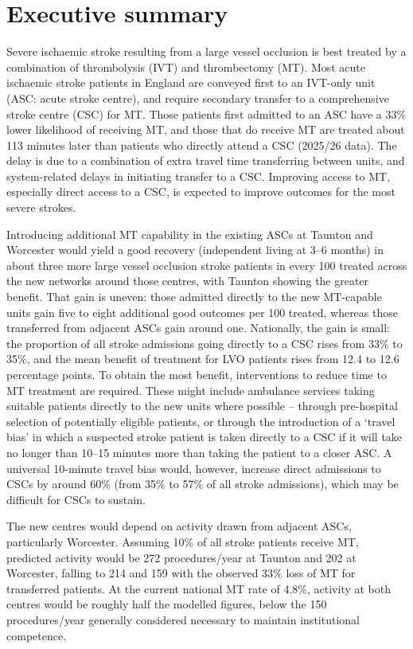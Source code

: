 \section*{Executive summary}

Severe ischaemic stroke resulting from a large vessel occlusion is best treated by a combination of thrombolysis (IVT) and thrombectomy (MT). Most acute ischaemic stroke patients in England are conveyed first to an IVT-only unit (ASC: acute stroke centre), and require secondary transfer to a comprehensive stroke centre (CSC) for MT. Those patients first admitted to an ASC have a 33\% lower likelihood of receiving MT, and those that do receive MT are treated about 113 minutes later than patients who directly attend a CSC (2025/26 data). The delay is due to a combination of extra travel time transferring between units, and system-related delays in initiating transfer to a CSC. Improving access to MT, especially direct access to a CSC, is expected to improve outcomes for the most severe strokes.

Introducing additional MT capability in the existing ASCs at Taunton and Worcester would yield a good recovery (independent living at 3–6 months) in about three more large vessel occlusion stroke patients in every 100 treated across the new networks around those centres, with Taunton showing the greater benefit. That gain is uneven: those admitted directly to the new MT-capable units gain five to eight additional good outcomes per 100 treated, whereas those transferred from adjacent ASCs gain around one. Nationally, the gain is small: the proportion of all stroke admissions going directly to a CSC rises from 33\% to 35\%, and the mean benefit of treatment for LVO patients rises from 12.4 to 12.6 percentage points. To obtain the most benefit, interventions to reduce time to MT treatment are required. These might include ambulance services taking suitable patients directly to the new units where possible -- through pre-hospital selection of potentially eligible patients, or through the introduction of a `travel bias' in which a suspected stroke patient is taken directly to a CSC if it will take no longer than 10--15 minutes more than taking the patient to a closer ASC. A universal 10-minute travel bias would, however, increase direct admissions to CSCs by around 60\% (from 35\% to 57\% of all stroke admissions), which may be difficult for CSCs to sustain.

The new centres would depend on activity drawn from adjacent ASCs, particularly Worcester. Assuming 10\% of all stroke patients receive MT, predicted activity would be 272 procedures/year at Taunton and 202 at Worcester, falling to 214 and 159 with the observed 33\% loss of MT for transferred patients. At the current national MT rate of 4.8\%, activity at both centres would be roughly half the modelled figures, below the 150 procedures/year generally considered necessary to maintain institutional competence.
